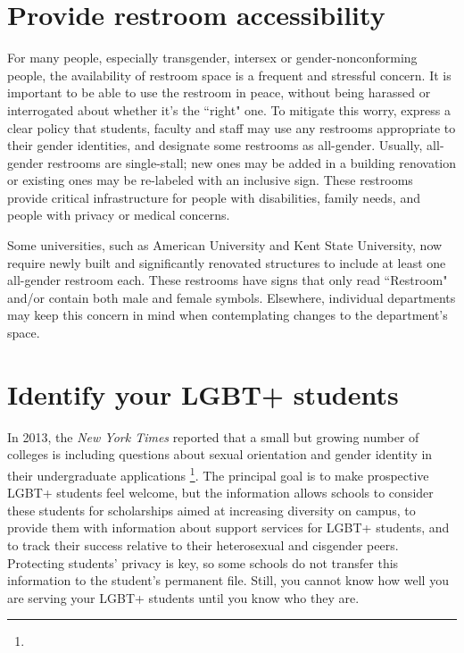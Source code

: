 \section {Provide restroom accessibility}
\label{restrooms}
For many people, especially transgender, intersex or gender-nonconforming people, the availability of restroom space is a frequent and stressful concern. It is important to be able to use the restroom in peace, without being harassed or interrogated about whether it's the ``right" one. To mitigate this worry, express a clear policy that students, faculty and staff may use any restrooms appropriate to their gender identities, and designate some restrooms as all-gender. Usually, all-gender restrooms are single-stall; new ones may be added in a building renovation or existing ones may be re-labeled with an inclusive sign. These restrooms provide critical infrastructure for people with disabilities, family needs, and people with privacy or medical concerns.

Some universities, such as American University and Kent State University, now require newly built and significantly renovated structures to include at least one all-gender restroom each. These restrooms have signs that only read ``Restroom" and/or contain both male and female symbols. Elsewhere, individual departments may keep this concern in mind when contemplating changes to the department's space.


\section {Identify your LGBT+ students}
\label{univ-identify}
In 2013, the {\em New York Times} reported that a small but growing number of colleges is including questions about sexual orientation and gender identity in their undergraduate applications \footnote{}.  The principal goal is to make prospective LGBT+ students feel welcome, but the information allows schools to consider these students for scholarships aimed at increasing diversity on campus, to provide them with information about support services for LGBT+ students, and to track their success relative to their heterosexual and cisgender peers.  Protecting students' privacy is key, so some schools do not transfer this information to the student's permanent file.  Still, you cannot know how well you are serving your LGBT+ students until you know who they are.



